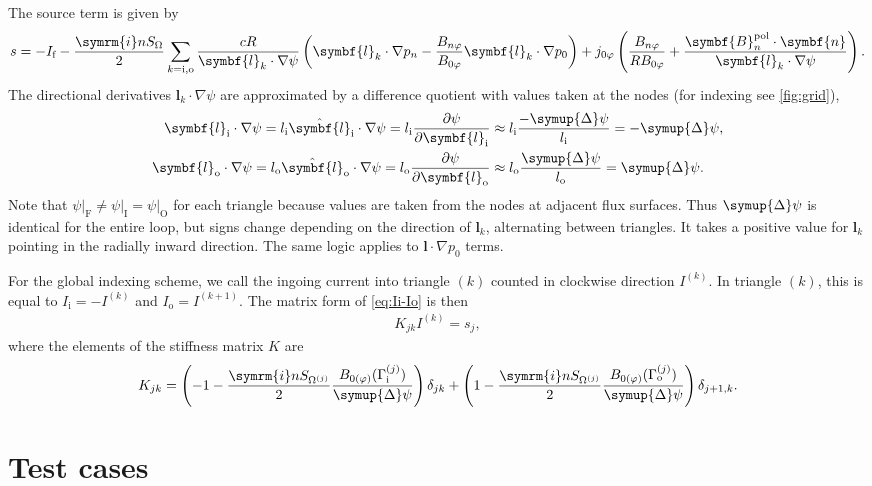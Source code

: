 \documentclass[a4paper, 10pt, english]{article}
\let\temp\varrho
\let\varrho\rho
\let\rho\temp
\let\temp\vartheta
\let\vartheta\theta
\let\theta\temp
\let\temp\varphi
\let\varphi\phi
\let\phi\temp
\let\vec\symbf
\newcommand*\im{\ensuremath{\symrm{i}}}  %
\newcommand*\pd[2][]{\ensuremath{\frac{\partial #1}{\partial #2}}}  %
\newcommand*\pol{\ensuremath{\textrm{pol}}}  %
\newcommand*\fs{\ensuremath{\textrm{f}}}  %
\newcommand*\inw{\ensuremath{\textrm{i}}}  %
\newcommand*\out{\ensuremath{\textrm{o}}}  %
\newcommand*\vfs{\ensuremath{\textrm{F}}}  %
\newcommand*\vinw{\ensuremath{\textrm{I}}}  %
\newcommand*\vout{\ensuremath{\textrm{O}}}  %
\begin{document}
The source term is given by
\begin{gather}
  s = -I_{\fs} - \frac{\im n S_{\Omega}}{2} \sum_{k = \inw, \out} \frac{c R}{\vec{l}_{k} \cdot \nabla \psi} \left( \vec{l}_{k} \cdot \nabla p_{n} - \frac{B_{n \phi}}{B_{0 \phi}} \vec{l}_{k} \cdot \nabla p_{0} \right) + j_{0 \phi} \left( \frac{B_{n \phi}}{R B_{0 \phi}} + \frac{\vec{B}_{n}^{\pol} \cdot \vec{n}}{\vec{l}_{k} \cdot \nabla \psi} \right).
\end{gather}
The directional derivatives $\vec{l}_{k} \cdot \nabla \psi$ are approximated by a difference quotient with values taken at the nodes (for indexing see \cref{fig:grid}),
\begin{align}
  \vec{l}_{\inw} \cdot \nabla \psi = l_{\inw} \hat{\vec{l}}_{\inw} \cdot \nabla \psi = l_{\inw} \pd[\psi]{\vec{l}_{\inw}} & \approx l_{\inw} \frac{-\symup{\Delta} \psi}{l_{\inw}} = -\symup{\Delta} \psi, \\
  \vec{l}_{\out} \cdot \nabla \psi = l_{\out} \hat{\vec{l}}_{\out} \cdot \nabla \psi = l_{\out} \pd[\psi]{\vec{l}_{\out}} & \approx l_{\out} \frac{\symup{\Delta} \psi}{l_{\out}} = \symup{\Delta} \psi.
\end{align}
Note that $\psi \vert_{\vfs} \neq \psi \vert_{\vinw} = \psi \vert_{\vout}$ for each triangle because values are taken from the nodes at adjacent flux surfaces. Thus $\symup{\Delta} \psi$ is identical for the entire loop, but signs change depending on the direction of $\vec{l}_{k}$, alternating between triangles. It takes a positive value for $\vec{l}_{k}$ pointing in the radially inward direction. The same logic applies to $\vec{l} \cdot \nabla p_{0}$ terms.

For the global indexing scheme, we call the ingoing current into triangle $(k)$ counted in clockwise direction $I^{(k)}$. In triangle $(k)$, this is equal to $I_{\inw} = -I^{(k)}$ and $I_{\out} = I^{(k+1)}$. The matrix form of \cref{eq:Ii-Io} is then
\begin{gather}
  K_{jk} I^{(k)} = s_{j},
\end{gather}
where the elements of the stiffness matrix $K$ are
\begin{gather}
  K_{jk} = \left( -1 - \frac{\im n S_{\Omega^{(j)}}}{2} \frac{B_{0 (\phi)} (\Gamma_{\inw}^{(j)})}{\symup{\Delta} \psi} \right) \delta_{jk} + \left( 1 - \frac{\im n S_{\Omega^{(j)}}}{2} \frac{B_{0 (\phi)} (\Gamma_{\out}^{(j)})}{\symup{\Delta} \psi} \right) \delta_{j+1, k}.
\end{gather}

\section{Test cases}
\end{document}
